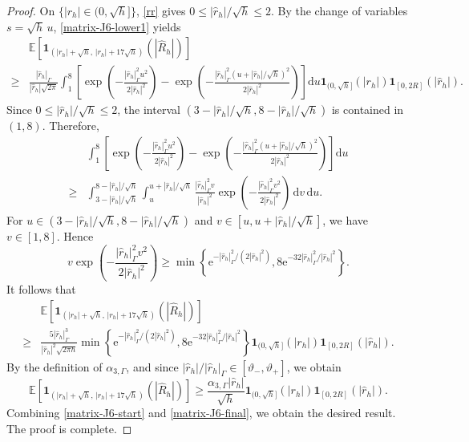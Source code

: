 \documentclass[aap]{imsart}
\theoremstyle{plain}
\theoremstyle{definition}
\begin{document}
\begin{proof}
	On \(\{|r_h|\in(0,\sqrt h]\}\), \eqref{rr} gives \(0\leqslant |\hat r_h|/\sqrt{h}\leqslant2\).
	By the change of variables \(s=\sqrt h\,u\), \eqref{matrix-J6-lower1} yields
	\begin{equation*}
		\begin{aligned}
			&\mathbb E\left[
			\mathbf 1_{(|r_h|+\sqrt h,\,|r_h|+17\sqrt h)}
			(|\hat R_h|)
			\right]  \\
			\geqslant&
			\frac{|\hat r_h|_\Gamma}{|\hat r_h|\sqrt{2\pi}}
			\int_1^8
			\left[
			\exp\left(-\frac{|\hat r_h|_\Gamma^2u^2}{2|\hat r_h|^2}\right)
			-
			\exp\left(-\frac{|\hat r_h|_\Gamma^2(u+|\hat r_h|/\sqrt{h})^2}{2|\hat r_h|^2}\right)
			\right]\mathrm du
			\mathbf 1_{(0,\sqrt h]}(|r_h|)
			\mathbf 1_{[0,2R]}(|\hat r_h|).
		\end{aligned}
	\end{equation*}
	Since \(0\leqslant |\hat r_h|/\sqrt{h}\leqslant2\), the interval \((3-|\hat r_h|/\sqrt{h},8-|\hat r_h|/\sqrt{h})\) is contained in \((1,8)\).
	Therefore,
	\[
	\begin{aligned}
		&\int_1^8
		\left[
		\exp\left(-\frac{|\hat r_h|_\Gamma^2u^2}{2|\hat r_h|^2}\right)
		-
		\exp\left(-\frac{|\hat r_h|_\Gamma^2(u+|\hat r_h|/\sqrt{h})^2}{2|\hat r_h|^2}\right)
		\right]\mathrm du\\
		\geqslant&
		\int_{3-|\hat r_h|/\sqrt{h}}^{8-|\hat r_h|/\sqrt{h}}
		\int_u^{u+|\hat r_h|/\sqrt{h}}
		\frac{|\hat r_h|_\Gamma^2v}{|\hat r_h|^2}
		\exp\left(-\frac{|\hat r_h|_\Gamma^2v^2}{2|\hat r_h|^2}\right)
		\,\mathrm dv\,\mathrm du .
	\end{aligned}
	\]
	For \(u\in(3-|\hat r_h|/\sqrt{h},8-|\hat r_h|/\sqrt{h})\) and \(v\in[u,u+|\hat r_h|/\sqrt{h}]\), we have \(v\in[1,8]\). Hence
	\[
	v\exp\left(-\frac{|\hat r_h|_\Gamma^2v^2}{2|\hat r_h|^2}\right)
	\geqslant
	\min\left\{
	\mathrm e^{-|\hat r_h|_\Gamma^2/(2|\hat r_h|^2)},
	8\mathrm e^{-32|\hat r_h|_\Gamma^2/|\hat r_h|^2}
	\right\}.
	\]
	It follows that
	\[
	\begin{aligned}
		&\mathbb E\left[
		\mathbf 1_{(|r_h|+\sqrt h,\,|r_h|+17\sqrt h)}
		(|\hat R_h|)
		\right]\\
		\geqslant&
		\frac{5|\hat r_h|_\Gamma^3}
		{|\hat r_h|^2\sqrt{2\pi h}}
		\min\left\{
		\mathrm e^{-|\hat r_h|_\Gamma^2/(2|\hat r_h|^2)},
		8\mathrm e^{-32|\hat r_h|_\Gamma^2/|\hat r_h|^2}
		\right\}\mathbf 1_{(0,\sqrt h]}(|r_h|)
		\mathbf 1_{[0,2R]}(|\hat r_h|).
	\end{aligned}
	\]
	By the definition of \(\alpha_{3,\Gamma}\), and since \(|\hat r_h|/|\hat r_h|_\Gamma\in[\vartheta_-,\vartheta_+]\),
	we obtain
	\begin{equation}\label{matrix-J6-final}
\mathbb E\left[
			\mathbf 1_{(|r_h|+\sqrt h,\,|r_h|+17\sqrt h)}
			(|\hat R_h|)
			\right]\geqslant
			\frac{\alpha_{3,\Gamma}|\hat r_h|}{\sqrt h}
			\mathbf 1_{(0,\sqrt h]}(|r_h|)
			\mathbf 1_{[0,2R]}(|\hat r_h|).
	\end{equation}
	Combining \eqref{matrix-J6-start} and \eqref{matrix-J6-final}, we obtain the desired result. The proof is complete.
\end{proof}
			
\end{document}
